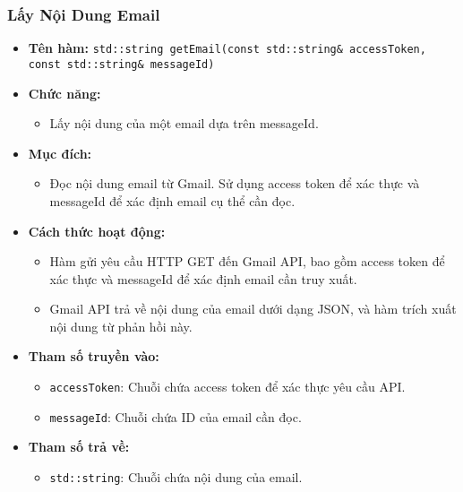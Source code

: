 \subsubsection{Lấy Nội Dung Email}
\begin{itemize}
    \item \textbf{Tên hàm:} \texttt{std::string getEmail(const std::string\& accessToken, const std::string\& messageId)}
    \item \textbf{Chức năng:} 
    \begin{itemize}
        \item Lấy nội dung của một email dựa trên messageId.
    \end{itemize}
    \item \textbf{Mục đích:} 
    \begin{itemize}
        \item Đọc nội dung email từ Gmail. Sử dụng access token để xác thực và messageId để xác định email cụ thể cần đọc.
    \end{itemize}
    \item \textbf{Cách thức hoạt động:} 
    \begin{itemize}
        \item Hàm gửi yêu cầu HTTP GET đến Gmail API, bao gồm access token để xác thực và messageId để xác định email cần truy xuất.
        \item Gmail API trả về nội dung của email dưới dạng JSON, và hàm trích xuất nội dung từ phản hồi này.
    \end{itemize}
    \item \textbf{Tham số truyền vào:} 
    \begin{itemize}
        \item \texttt{accessToken}: Chuỗi chứa access token để xác thực yêu cầu API.
        \item \texttt{messageId}: Chuỗi chứa ID của email cần đọc.
    \end{itemize}
    \item \textbf{Tham số trả về:} 
    \begin{itemize}
        \item \texttt{std::string}: Chuỗi chứa nội dung của email.
    \end{itemize}
\end{itemize}

